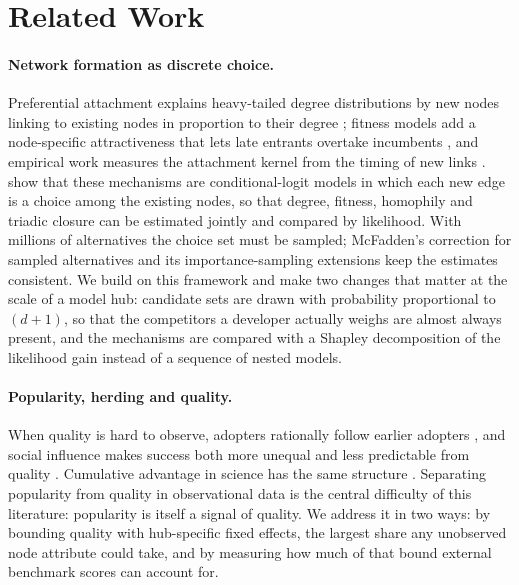\section{Related Work}
\label{sec:related}

\paragraph{Network formation as discrete choice.}
Preferential attachment explains heavy-tailed degree distributions by new nodes linking to existing nodes in
proportion to their degree \citep{price1976general,barabasi1999emergence}; fitness models add a node-specific
attractiveness that lets late entrants overtake incumbents \citep{bianconi2001competition,wang2013quantifying}, and
empirical work measures the attachment kernel from the timing of new links
\citep{newman2001clustering,jeong2003measuring}. \citet{overgoor2019choosing} show that these mechanisms are
conditional-logit models in which each new edge is a choice among the existing nodes, so that degree, fitness,
homophily and triadic closure can be estimated jointly and compared by likelihood. With millions of alternatives
the choice set must be sampled; McFadden's correction for sampled alternatives \citep{mcfadden1978modelling} and its
importance-sampling extensions \citep{overgoor2020scaling} keep the estimates consistent. We build on this framework
and make two changes that matter at the scale of a model hub: candidate sets are drawn with probability
proportional to $(d+1)$, so that the competitors a developer actually weighs are almost always present, and the
mechanisms are compared with a Shapley decomposition of the likelihood gain instead of a sequence of nested models.

\paragraph{Popularity, herding and quality.}
When quality is hard to observe, adopters rationally follow earlier adopters
\citep{banerjee1992simple,bikhchandani1992theory}, and social influence makes success both more unequal and less
predictable from quality \citep{salganik2006experimental}. Cumulative advantage in science has the same structure
\citep{merton1968matthew}. Separating popularity from quality in observational data is the central difficulty of
this literature: popularity is itself a signal of quality. We address it in two ways: by bounding quality with
hub-specific fixed effects, the largest share any unobserved node attribute could take, and by measuring how much of
that bound external benchmark scores can account for.

